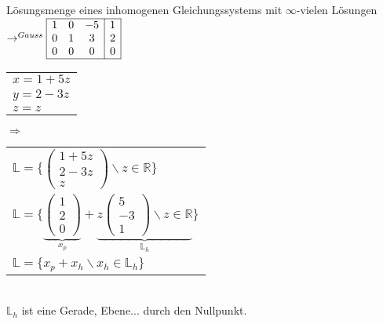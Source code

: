 	Lösungsmenge eines inhomogenen Gleichungssystems mit $\infty$-vielen Lösungen\\
	$\rightarrow^{Gauss} \begin{array}{|ccc|c|}
		\hline 1 & 0 & -5 & 1 \\
		0 & 1 & 3 & 2\\
		0 & 0 & 0 & 0\\
		\hline \end{array}$ \begin{tabular}{l}
			$x = 1 + 5z$ \\
			$y = 2 - 3z$ \\
			$z = z$ \end{tabular} $\Rightarrow$ \begin{tabular}{l}
				$\mathbb{L}=\lbrace\left(\begin{array}{c}
					1+5z\\
					2-3z\\
					z \end{array}\right)\backslash z \in \mathbb{R} \rbrace$\\
				$\mathbb{L}=\lbrace\underbrace{\left(\begin{array}{c} 1 \\ 2 \\ 0 \end{array}\right)}_{x_p}
				+ \underbrace{z\left(\begin{array}{c} 5 \\ -3 \\ 1 \end{array}\right) \backslash z \in \mathbb{R}}_{\mathbb{L}_h} \rbrace$ \\
				$\mathbb{L}=\lbrace x_p + x_h \backslash x_h \in \mathbb{L}_h\rbrace$
			\end{tabular}\\

	$\mathbb{L}_h$  ist eine Gerade, Ebene... durch den Nullpunkt.


		